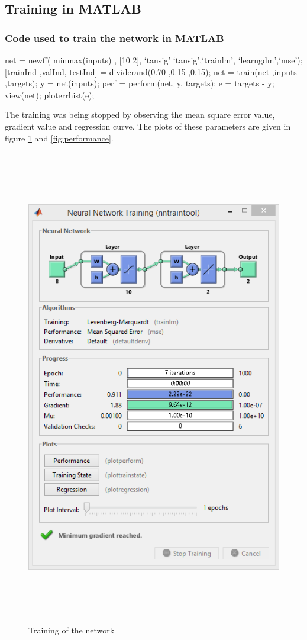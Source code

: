 \documentclass[14pt,a4paper]{extarticle}
\begin{document}
\subsection{Training in MATLAB}

 \subsubsection{Code used to train the network in MATLAB}
 
 \begin{spverbatim}
net = newff( minmax(inputs) , [10 2], {`tansig' `tansig'},`trainlm',
`learngdm',`mse');
[trainInd ,valInd, testInd] = dividerand(0.70 ,0.15 ,0.15);
net = train(net ,inputs ,targets);
y = net(inputs);
perf = perform(net, y, targets);
e = targets - y;
view(net);
ploterrhist(e);
 \end{spverbatim}
 
 	The training was being stopped by observing the mean square error value, gradient value and regression curve. The plots of these parameters are given in figure \ref{fig:nntool} and \ref{fig:performance}.
 	
 	\begin{figure}[H]
 		\includegraphics[height=21cm, scale = 0.5, center]{nntoolmatlab.png}
 		\caption{Training of the network}
 		\label{fig:nntool}
 	\end{figure}
 	
\end{document}

